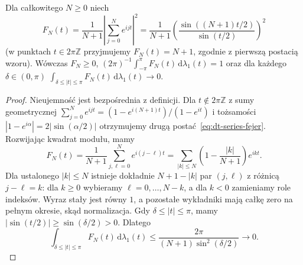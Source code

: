 \begin{lemat}
\label{lem:dt-series-fejer}
Dla całkowitego $N\geq0$ niech
\begin{equation}\label{eq:dt-series-fejer}
 F_N(t)=\frac1{N+1}\left|\sum_{j=0}^Ne^{ijt}\right|^2
 =\frac1{N+1}\left(\frac{\sin((N+1)t/2)}{\sin(t/2)}\right)^2
\end{equation}
(w punktach $t\in2\pi\mathbb Z$ przyjmujemy
$F_N(t)=N+1$, zgodnie z pierwszą postacią wzoru). Wówczas $F_N\ge0$,
$(2\pi)^{-1}\int_{-\pi}^{\pi}F_N(t)\,\mathrm d\lambda_1(t)=1$ oraz
dla każdego $\delta\in(0,\pi)$
$\int_{\delta\le|t|\le\pi}F_N(t)\,\mathrm d\lambda_1(t)\to0$.
\end{lemat}
\begin{proof}
Nieujemność jest bezpośrednia z definicji.
Dla $t\notin2\pi\mathbb Z$ z sumy geometrycznej
$\sum_{j=0}^N e^{ijt}=(1-e^{i(N+1)t})/(1-e^{it})$
i tożsamości $|1-e^{i\alpha}|=2|\sin(\alpha/2)|$
otrzymujemy drugą postać~\eqref{eq:dt-series-fejer}.
Rozwijając kwadrat modułu, mamy
\[
 F_N(t)=\frac1{N+1}\sum_{j,\ell=0}^N e^{i(j-\ell)t}
 =\sum_{|k|\leq N}\left(1-\frac{|k|}{N+1}\right)e^{ikt}.
\]
Dla ustalonego $|k|\leq N$ istnieje dokładnie
$N+1-|k|$ par $(j,\ell)$ z różnicą $j-\ell=k$:
dla $k\geq0$ wybieramy $\ell=0,\ldots,N-k$,
a dla $k<0$ zamieniamy role indeksów.
Wyraz stały jest równy $1$, a pozostałe
wykładniki mają całkę zero na pełnym okresie,
skąd normalizacja. Gdy $\delta\leq|t|\leq\pi$,
mamy $|\sin(t/2)|\geq\sin(\delta/2)>0$.
Dlatego
\[
 \int_{\delta\leq|t|\leq\pi}F_N(t)\,\mathrm d\lambda_1(t)
 \leq\frac{2\pi}{(N+1)\sin^2(\delta/2)}
 \longrightarrow0.
\]
\end{proof}

